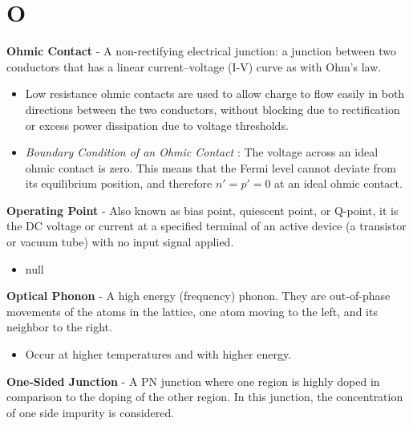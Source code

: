 \section{O}
    \textbf{Ohmic Contact} - A non-rectifying electrical junction: a junction between two conductors that has a linear current–voltage (I-V) curve as with Ohm's law.
    \vspace{0.15cm}
    \begin{itemize}
        \setlength\itemsep{0.5em}
        \item{Low resistance ohmic contacts are used to allow charge to flow easily in both directions between the two conductors, without blocking due to rectification or excess power dissipation due to voltage thresholds.}
        \item{\emph{Boundary Condition of an Ohmic Contact} : The voltage across an ideal ohmic contact is zero.  This means that the Fermi level cannot deviate from its equilibrium position, and therefore $n'=p'=0$ at an ideal ohmic contact.}
    \end{itemize}
\vspace{0.5cm}
    \textbf{Operating Point} - Also known as bias point, quiescent point, or Q-point, it is the DC voltage or current at a specified terminal of an active device (a transistor or vacuum tube) with no input signal applied.
    \vspace{0.15cm}
    \begin{itemize}
        \setlength\itemsep{0.5em}
        \item{null}
    \end{itemize}
\vspace{0.5cm}
    \textbf{Optical Phonon} - A high energy (frequency) phonon.  They are out-of-phase movements of the atoms in the lattice, one atom moving to the left, and its neighbor to the right.
    \vspace{0.15cm}
    \begin{itemize}
        \setlength\itemsep{0.5em}
        \item{Occur at higher temperatures and with higher energy.}
    \end{itemize}
\vspace{0.5cm}
    \textbf{One-Sided Junction} - A PN junction where one region is highly doped in comparison to the doping of the other region. In this junction, the concentration of one side impurity is considered.
